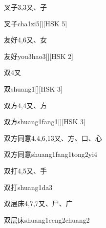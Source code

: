 \begin{entry}{叉子}{3,3}{⼜、⼦}
  \begin{phonetics}{叉子}{cha1zi5}[][HSK 5]
  \end{phonetics}
\end{entry}

\begin{entry}{友好}{4,6}{⼜、⼥}
  \begin{phonetics}{友好}{you3hao3}[][HSK 2]
  \end{phonetics}
\end{entry}

\begin{entry}{双}{4}{⼜}
  \begin{phonetics}{双}{shuang1}[][HSK 3]
  \end{phonetics}
\end{entry}

\begin{entry}{双方}{4,4}{⼜、⽅}
  \begin{phonetics}{双方}{shuang1fang1}[][HSK 3]
  \end{phonetics}
\end{entry}

\begin{entry}{双方同意}{4,4,6,13}{⼜、⽅、⼝、⼼}
  \begin{phonetics}{双方同意}{shuang1fang1tong2yi4}
  \end{phonetics}
\end{entry}

\begin{entry}{双打}{4,5}{⼜、⼿}
  \begin{phonetics}{双打}{shuang1da3}
  \end{phonetics}
\end{entry}

\begin{entry}{双层床}{4,7,7}{⼜、⼫、⼴}
  \begin{phonetics}{双层床}{shuang1ceng2chuang2}
  \end{phonetics}
\end{entry}

